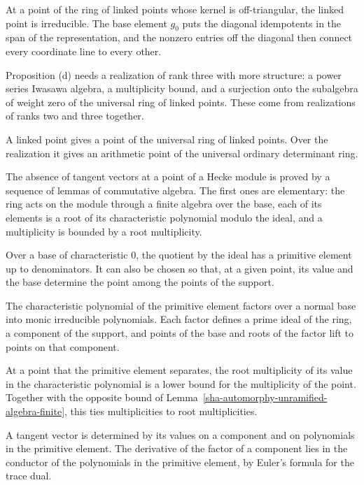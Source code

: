 At a point of the ring of linked points whose kernel is off-triangular, the linked point is irreducible. The base element $g_0$ puts the diagonal idempotents in the span of the representation, and the nonzero entries off the diagonal then connect every coordinate line to every other.

Proposition (d) needs a realization of rank three with more structure: a power series Iwasawa algebra, a multiplicity bound, and a surjection onto the subalgebra of weight zero of the universal ring of linked points. These come from realizations of ranks two and three together.

A linked point gives a point of the universal ring of linked points. Over the realization it gives an arithmetic point of the universal ordinary determinant ring.

The absence of tangent vectors at a point of a Hecke module is proved by a sequence of lemmas of commutative algebra. The first ones are elementary: the ring acts on the module through a finite algebra over the base, each of its elements is a root of its characteristic polynomial modulo the ideal, and a multiplicity is bounded by a root multiplicity.

Over a base of characteristic $0$, the quotient by the ideal has a primitive element up to denominators. It can also be chosen so that, at a given point, its value and the base determine the point among the points of the support.

The characteristic polynomial of the primitive element factors over a normal base into monic irreducible polynomials. Each factor defines a prime ideal of the ring, a component of the support, and points of the base and roots of the factor lift to points on that component.

At a point that the primitive element separates, the root multiplicity of its value in the characteristic polynomial is a lower bound for the multiplicity of the point. Together with the opposite bound of Lemma~\ref{sha-automorphy-unramified-algebra-finite}, this ties multiplicities to root multiplicities.

A tangent vector is determined by its values on a component and on polynomials in the primitive element. The derivative of the factor of a component lies in the conductor of the polynomials in the primitive element, by Euler's formula for the trace dual.

